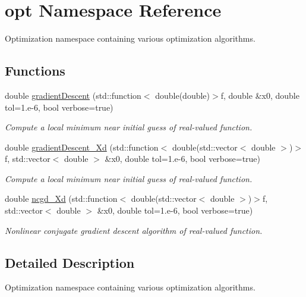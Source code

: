 \hypertarget{namespaceopt}{}\section{opt Namespace Reference}
\label{namespaceopt}


Optimization namespace containing various optimization algorithms.  


\subsection*{Functions}
\begin{DoxyCompactItemize}
\item 
double \mbox{\hyperlink{namespaceopt_af1ef2e32062af31429ae74fc07c57fb0}{gradient\+Descent}} (std\+::function$<$ double(double)$>$f, double \&x0, double tol=1.e-\/6, bool verbose=true)
\begin{DoxyCompactList}\small\item\em Compute a local minimum near initial guess of real-\/valued function. \end{DoxyCompactList}\item 
double \mbox{\hyperlink{namespaceopt_a7db27c86e1c5a503b7f8373ba067d97b}{gradient\+Descent\+\_\+\+Xd}} (std\+::function$<$ double(std\+::vector$<$ double $>$)$>$f, std\+::vector$<$ double $>$ \&x0, double tol=1.e-\/6, bool verbose=true)
\begin{DoxyCompactList}\small\item\em Compute a local minimum near initial guess of real-\/valued function. \end{DoxyCompactList}\item 
double \mbox{\hyperlink{namespaceopt_a8f434753958049daab7129ea247a97ff}{ncgd\+\_\+\+Xd}} (std\+::function$<$ double(std\+::vector$<$ double $>$)$>$f, std\+::vector$<$ double $>$ \&x0, double tol=1.e-\/6, bool verbose=true)
\begin{DoxyCompactList}\small\item\em Nonlinear conjugate gradient descent algorithm of real-\/valued function. \end{DoxyCompactList}\end{DoxyCompactItemize}


\subsection{Detailed Description}
Optimization namespace containing various optimization algorithms. 


